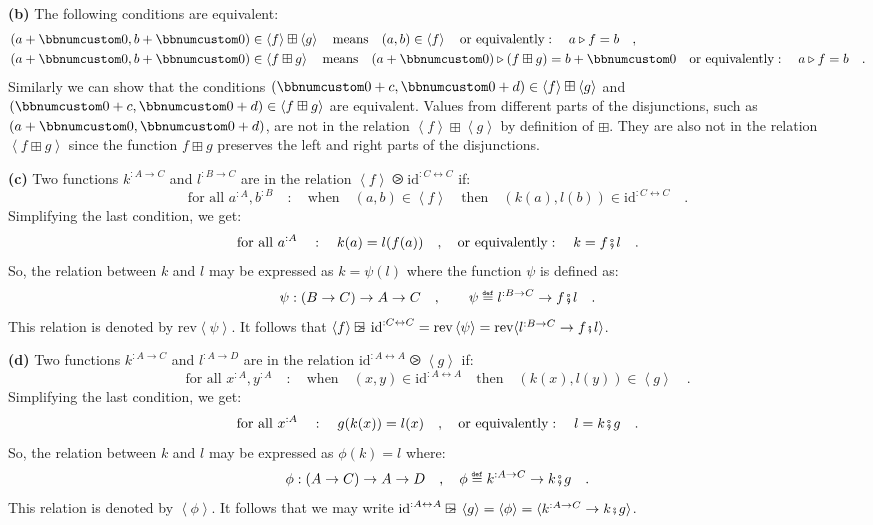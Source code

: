 \textbf{(b)} The following conditions are equivalent:
\begin{align*}
 & (a+\bbnum 0,b+\bbnum 0)\in\left<f\right>\boxplus\left<g\right>\quad\text{means}\quad(a,b)\in\left<f\right>\quad\text{or equivalently}:\quad a\triangleright f=b\quad,\\
 & (a+\bbnum 0,b+\bbnum 0)\in\left<f\boxplus g\right>\quad\text{means}\quad(a+\bbnum 0)\triangleright(f\boxplus g)=b+\bbnum 0\quad\text{or equivalently}:\quad a\triangleright f=b\quad.
\end{align*}
Similarly we can show that the conditions $(\bbnum 0+c,\bbnum 0+d)\in\left<f\right>\boxplus\left<g\right>$
and $(\bbnum 0+c,\bbnum 0+d)\in\left<f\boxplus g\right>$ are equivalent.
Values from different parts of the disjunctions, such as $(a+\bbnum 0,\bbnum 0+d)$,
are not in the relation $\left<f\right>\boxplus\left<g\right>$ by
definition of $\boxplus$. They are also not in the relation $\left<f\boxplus g\right>$
since the function $f\boxplus g$ preserves the left and right parts
of the disjunctions.

\textbf{(c)} Two functions $k^{:A\rightarrow C}$ and $l^{:B\rightarrow C}$
are in the relation $\left<f\right>\ogreaterthan\text{id}^{:C\leftrightarrow C}$
if:
\[
\text{for all }a^{:A},b^{:B}\quad:\quad\text{when}\quad(a,b)\in\left<f\right>\quad\text{then}\quad(k(a),l(b))\in\text{id}^{:C\leftrightarrow C}\quad.
\]
Simplifying the last condition, we get:
\[
\text{for all }a^{:A}\quad:\quad k(a)=l(f(a))\quad,\quad\text{or equivalently}:\quad k=f\bef l\quad.
\]
So, the relation between $k$ and $l$ may be expressed as $k=\psi(l)$
where the function $\psi$ is defined as:
\[
\psi:\left(B\rightarrow C\right)\rightarrow A\rightarrow C\quad,\quad\quad\psi\triangleq l^{:B\rightarrow C}\rightarrow f\bef l\quad.
\]
This relation is denoted by $\text{rev}\left<\psi\right>$. It follows
that $\left<f\right>\ogreaterthan\text{id}^{:C\leftrightarrow C}=\text{rev}\left<\psi\right>=\text{rev}\langle l^{:B\rightarrow C}\rightarrow f\bef l\rangle$.

\textbf{(d)} Two functions $k^{:A\rightarrow C}$ and $l^{:A\rightarrow D}$
are in the relation $\text{id}^{:A\leftrightarrow A}\ogreaterthan\left<g\right>$
if:
\[
\text{for all }x^{:A},y^{:A}\quad:\quad\text{when}\quad(x,y)\in\text{id}^{:A\leftrightarrow A}\quad\text{then}\quad(k(x),l(y))\in\left<g\right>\quad.
\]
Simplifying the last condition, we get:
\[
\text{for all }x^{:A}\quad:\quad g(k(x))=l(x)\quad,\quad\text{or equivalently}:\quad l=k\bef g\quad.
\]
So, the relation between $k$ and $l$ may be expressed as $\phi(k)=l$
where:
\[
\phi:\left(A\rightarrow C\right)\rightarrow A\rightarrow D\quad,\quad\phi\triangleq k^{:A\rightarrow C}\rightarrow k\bef g\quad.
\]
This relation is denoted by $\left<\phi\right>$. It follows that
we may write $\text{id}^{:A\leftrightarrow A}\ogreaterthan\left<g\right>=\left<\phi\right>=\langle k^{:A\rightarrow C}\rightarrow k\bef g\rangle$.

